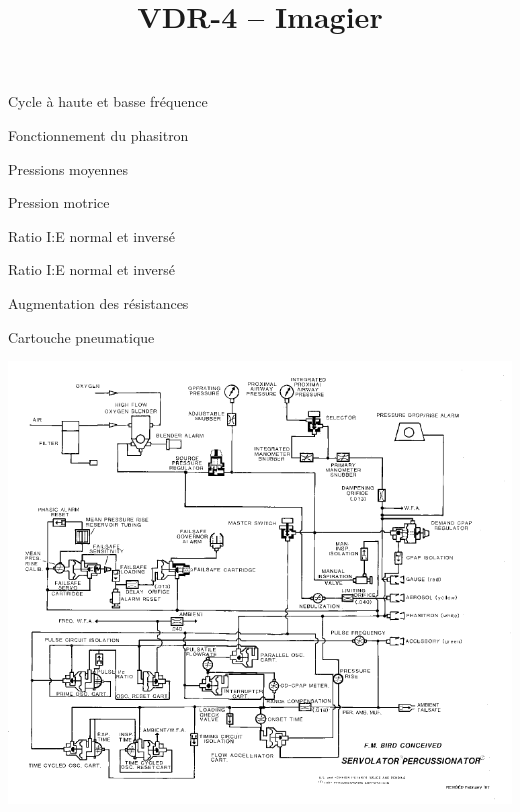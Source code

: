 \documentclass[aspectratio=169]{beamer}
\title{VDR-4 -- Imagier}
\institute{}
\begin{document}
\maketitle

\begin{frame}{Cycle à haute et basse fréquence}
	
\end{frame}

\begin{frame}{Fonctionnement du phasitron}
	
\end{frame}

\begin{frame}{Pressions moyennes}
	
\end{frame}

\begin{frame}{Pression motrice}
	
\end{frame}

\begin{frame}{Ratio I:E normal et inversé}
	
\end{frame}

\begin{frame}{Ratio I:E normal et inversé}
	
\end{frame}

\begin{frame}{Augmentation des résistances}
	
\end{frame}

\begin{frame}{Cartouche pneumatique}
	
\end{frame}

\begin{frame}[b]
	\centering
	\includegraphics[height=\textheight]{img/circuit-logique.pdf}
\end{frame}
\end{document}
